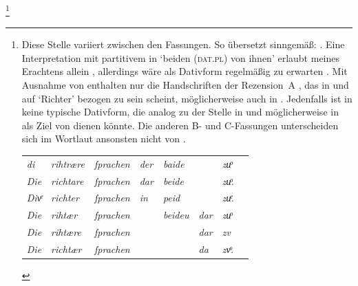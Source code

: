 	\footnote{Diese Stelle variiert zwischen den Fassungen. So übersetzt
		\citeauthor{myers2013} sinngemäß: . Eine Interpretation mit partitivem 
		in  `beiden (\textsc{dat.pl}) von ihnen' erlaubt meines
		Erachtens allein \citet{kc:A1} \autocite[vgl.][\pno~\textit{zuo
		sprëchen}]{lexer:mhdhwb}, allerdings wäre als Dativform regelmäßig
		 zu erwarten \autocite[182]{ksw2}. Mit Ausnahme von
		\citet{kc:B1} enthalten nur die Handschriften der Rezension~A
		, das in \citet{kc:H} und \citet{kc:B1} auf 
		`Richter' bezogen zu sein scheint, möglicherweise auch in
		\citet{kc:W}. Jedenfalls ist  in \citet{kc:B1} keine
		typische Dativform, die analog zu der Stelle in \citet{kc:A1} und
		möglicherweise in \citet{kc:W} als Ziel von  dienen
		könnte. Die anderen B- und C-Fassungen unterscheiden sich im Wortlaut
		ansonsten nicht von \citet{kc:VB}.
		
			\begin{tabular}[t]{
				@{}
				>{\itshape}l @{~}
				>{\itshape}l @{~}
				>{\itshape}l @{~}
				>{\itshape}l @{~}
				>{\itshape}l @{~}
				>{\itshape}l @{~}
				>{\itshape}l
				l
				@{}
			}
			di
				& rihtrære
				& ſprachen
				& der
				& baide
				& %
				& zuͦ
				& \parencite[\pno~44\ra, 29--30]{kc:A1}
				\\

			Die
				& richtare
				& ſprachen
				& dar
				& beide
				& %
				& zuͦ.
				& \parencite[\pno~60\vb, 28]{kc:H}
				\\

			Divͤ
				& richter
				& ſprachen
				& in
				& peid
				& %
				& zuͤ.
				& \parencite[\pno~68\va, 13--14]{kc:W}
				\\

			Die
				& rihtær
				& ſprachen
				& %
				& beideu
				& dar
				& zuͦ
				& \parencites[\pno~28\ra, 8]{kc:B1}
				\\

			Die
				& rihtære
				& ſprachen
				& %
				& %
				& dar
				& zv
				& \parencite[\pno~48\va, 23]{kc:VB}
				\\

			Die
				& richtær
				& ſprachen
				& %
				& %
				& da
				& zvͦ.
				& \parencite[\pno~53\ra, 29]{kc:C1}
				\\
			\end{tabular}
		}

